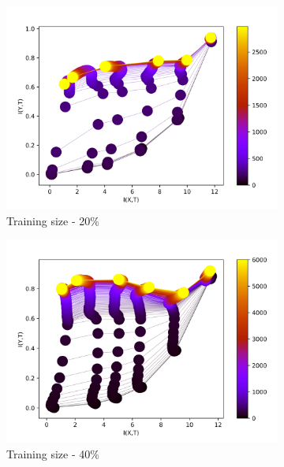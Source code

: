 \documentclass[dissertation.tex]{subfiles}
\begin{document}
\begin{figure}[ht]
  \centering
  \begin{subfigure}[t]{0.32\textwidth}
    \centering
    \includegraphics[width=\textwidth]{figs/eval/trainingSize/KDE20.png}
    \caption{
      Training size - 20\%
    }
    \label{figKDETS20}
  \end{subfigure}
  \begin{subfigure}[t]{0.32\textwidth}
    \centering
    \includegraphics[width=\textwidth]{figs/eval/trainingSize/KDE40.png}
    \caption{
      Training size - 40\%
    }
    \label{figKDETS40}
  \end{subfigure}
  \begin{subfigure}[t]{0.32\textwidth}

\end{subfigure}
\end{figure}
\end{document}
